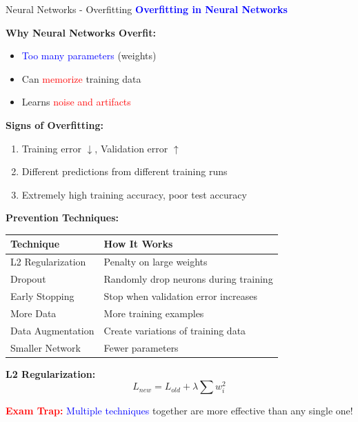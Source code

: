 \documentclass[8pt]{beamer}
\begin{document}
	\begin{frame}{Neural Networks - Overfitting}
		\fontsize{6.5}{7.5}\selectfont
		\textcolor{blue}{\textbf{Overfitting in Neural Networks}}
		
		\textbf{Why Neural Networks Overfit:}
		\begin{itemize}
			\item \textcolor{blue}{Too many parameters} (weights)
			\item Can \textcolor{red}{memorize} training data
			\item Learns \textcolor{red}{noise and artifacts}
		\end{itemize}
		
		\textbf{Signs of Overfitting:}
		\begin{enumerate}
			\item Training error $\downarrow$, Validation error $\uparrow$
			\item Different predictions from different training runs
			\item Extremely high training accuracy, poor test accuracy
		\end{enumerate}
		
		\textbf{Prevention Techniques:}
		
		\begin{tabular}{|p{4cm}|p{4cm}|}
			\hline
			\textbf{Technique} & \textbf{How It Works} \\
			\hline
			L2 Regularization & Penalty on large weights \\
			\hline
			Dropout & Randomly drop neurons during training \\
			\hline
			Early Stopping & Stop when validation error increases \\
			\hline
			More Data & More training examples \\
			\hline
			Data Augmentation & Create variations of training data \\
			\hline
			Smaller Network & Fewer parameters \\
			\hline
		\end{tabular}
		
		\textbf{L2 Regularization:}
		\[
		L_{new} = L_{old} + \lambda \sum w_i^2
		\]
		
		\textcolor{red}{\textbf{Exam Trap:}} \textcolor{blue}{Multiple techniques} together are more effective than any single one!
	\end{frame}
	
\end{document}
